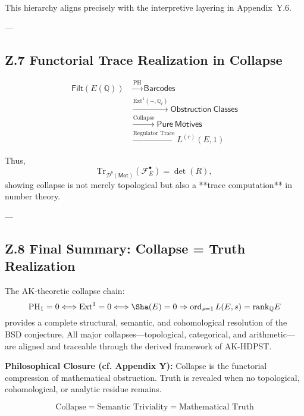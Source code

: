 This hierarchy aligns precisely with the interpretive layering in Appendix~Y.6.

---

\subsection*{Z.7 Functorial Trace Realization in Collapse}

\begin{align*}
\mathsf{Filt}(E(\mathbb{Q})) 
&\xrightarrow{\mathrm{PH}} \mathsf{Barcodes} \\
&\xrightarrow{\text{Ext}^1(-, \mathbb{Q}_\ell)} \mathsf{Obstruction~Classes} \\
&\xrightarrow{\text{Collapse}} \mathsf{Pure~Motives} \\
&\xrightarrow{\text{Regulator~Trace}} L^{(r)}(E,1)
\end{align*}

Thus,
\[
\mathrm{Tr}_{\mathcal{D}^b(\mathsf{Mot})}(\mathcal{F}_E^\bullet) = \det(R),
\]
showing collapse is not merely topological but also a **trace computation** in number theory.

---

\subsection*{Z.8 Final Summary: Collapse = Truth Realization}

The AK-theoretic collapse chain:
\[
\mathrm{PH}_1 = 0 \Longleftrightarrow \mathrm{Ext}^1 = 0 \Longleftrightarrow \Sha(E) = 0 \Rightarrow \operatorname{ord}_{s=1} L(E,s) = \mathrm{rank}_\mathbb{Q} E
\]
provides a complete structural, semantic, and cohomological resolution of the BSD conjecture.  
All major collapses—topological, categorical, and arithmetic—are aligned and traceable through the derived framework of AK-HDPST.

\textbf{Philosophical Closure (cf. Appendix Y):}  
Collapse is the functorial compression of mathematical obstruction.  
Truth is revealed when no topological, cohomological, or analytic residue remains.

\[
\text{Collapse} = \text{Semantic Triviality} = \text{Mathematical Truth}
\]





